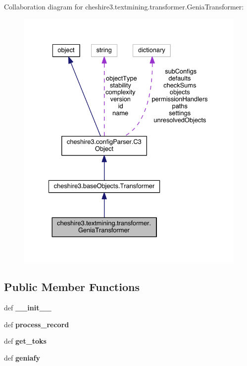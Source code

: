 Collaboration diagram for cheshire3.\-textmining.\-transformer.\-Genia\-Transformer\-:
\nopagebreak
\begin{figure}[H]
\begin{center}
\leavevmode
\includegraphics[width=331pt]{classcheshire3_1_1textmining_1_1transformer_1_1_genia_transformer__coll__graph}
\end{center}
\end{figure}
\subsection*{Public Member Functions}
\begin{DoxyCompactItemize}
\item 
\hypertarget{classcheshire3_1_1textmining_1_1transformer_1_1_genia_transformer_a2d33b99edf9255ac4e691eeaadd66a8f}{def {\bfseries \-\_\-\-\_\-init\-\_\-\-\_\-}}\label{classcheshire3_1_1textmining_1_1transformer_1_1_genia_transformer_a2d33b99edf9255ac4e691eeaadd66a8f}

\item 
\hypertarget{classcheshire3_1_1textmining_1_1transformer_1_1_genia_transformer_ad3719d1c4e9e6668cbe92be0050ac23f}{def {\bfseries process\-\_\-record}}\label{classcheshire3_1_1textmining_1_1transformer_1_1_genia_transformer_ad3719d1c4e9e6668cbe92be0050ac23f}

\item 
\hypertarget{classcheshire3_1_1textmining_1_1transformer_1_1_genia_transformer_ab8480bd1541933a61e3771eeb388d91b}{def {\bfseries get\-\_\-toks}}\label{classcheshire3_1_1textmining_1_1transformer_1_1_genia_transformer_ab8480bd1541933a61e3771eeb388d91b}

\item 
\hypertarget{classcheshire3_1_1textmining_1_1transformer_1_1_genia_transformer_a739abc90742d956efcf280d479d3d271}{def {\bfseries geniafy}}\label{classcheshire3_1_1textmining_1_1transformer_1_1_genia_transformer_a739abc90742d956efcf280d479d3d271}

\end{DoxyCompactItemize}
